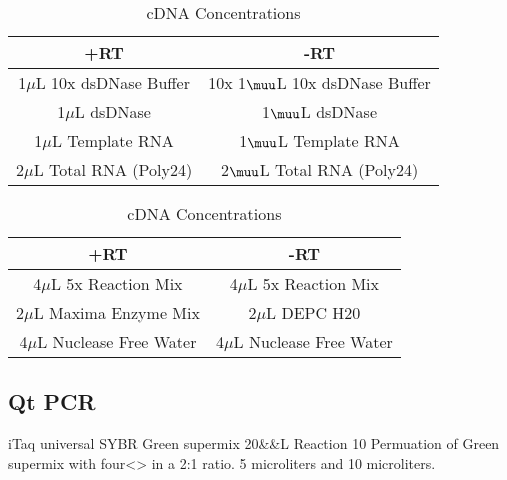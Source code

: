 \documentclass[journal, a4paper]{IEEEtran}
\begin{document}
        \begin{table}[!hbt]
          \begin{center}
          \caption{cDNA Concentrations}
          \label{tab:simParameters}
          \begin{tabular}{|c|c|}
            \hline
            +RT & -RT \\
            \hline
            1$\mu$L 10x dsDNase Buffer & 10x 1$\muu$L 10x dsDNase Buffer \\
            \hline
            1$\mu$L dsDNase & 1$\muu$L dsDNase \\
            \hline
            1$\mu$L Template RNA & 1$\muu$L Template RNA \\
            \hline
            2$\mu$L Total RNA (Poly24) & 2$\muu$L Total RNA (Poly24) \\
            \hline
          \end{tabular}
          \end{center}
        \end{table}

        \begin{table}[!hbt]
          \begin{center}
          \caption{cDNA Concentrations}
          \label{tab:simParameters}
          \begin{tabular}{|c|c|}
            \hline
            +RT & -RT \\
            \hline
            4$\mu$L 5x Reaction Mix & 4$\mu$L 5x Reaction Mix \\
            \hline
            2$\mu$L Maxima Enzyme Mix & 2$\mu$L DEPC H20 \\
            \hline
            4$\mu$L Nuclease Free Water & 4$\mu$L Nuclease Free Water \\
            \hline
          \end{tabular}
          \end{center}
        \end{table}

    \subsection{Qt PCR}

      iTaq universal SYBR Green supermix 20&\mu&L Reaction
      10
      Permuation of Green supermix with four<> in a 2:1 ratio.
      5 microliters and 10 microliters.
\end{document}
